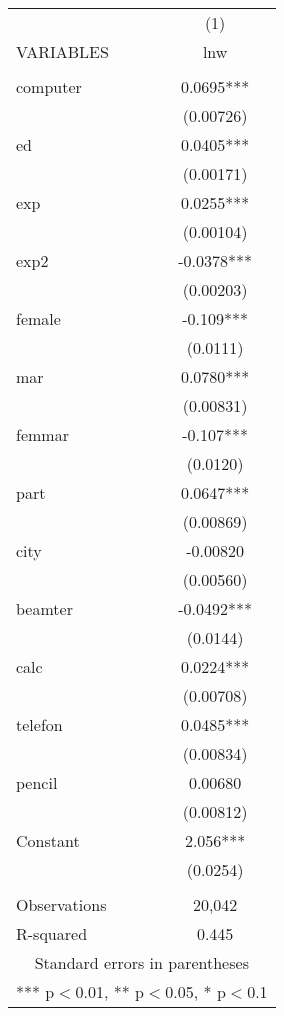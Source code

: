 \begin{tabular}{lc} \hline
 & (1) \\
VARIABLES & lnw \\ \hline
 &  \\
computer & 0.0695*** \\
 & (0.00726) \\
ed & 0.0405*** \\
 & (0.00171) \\
exp & 0.0255*** \\
 & (0.00104) \\
exp2 & -0.0378*** \\
 & (0.00203) \\
female & -0.109*** \\
 & (0.0111) \\
mar & 0.0780*** \\
 & (0.00831) \\
femmar & -0.107*** \\
 & (0.0120) \\
part & 0.0647*** \\
 & (0.00869) \\
city & -0.00820 \\
 & (0.00560) \\
beamter & -0.0492*** \\
 & (0.0144) \\
calc & 0.0224*** \\
 & (0.00708) \\
telefon & 0.0485*** \\
 & (0.00834) \\
pencil & 0.00680 \\
 & (0.00812) \\
Constant & 2.056*** \\
 & (0.0254) \\
 &  \\
Observations & 20,042 \\
 R-squared & 0.445 \\ \hline
\multicolumn{2}{c}{ Standard errors in parentheses} \\
\multicolumn{2}{c}{ *** p$<$0.01, ** p$<$0.05, * p$<$0.1} \\
\end{tabular}
